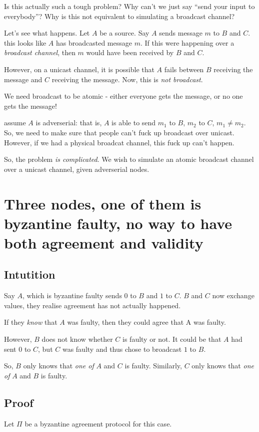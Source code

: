 \begin{itemize}
  Is this actually such a tough problem? Why can't we just say ``send your input to everybody''? Why is this not equivalent to simulating
  a broadcast channel?

  Let's see what happens. Let $A$ be a source. Say $A$ sends message $m$ to $B$
  and $C$. this looks like $A$ has broadcasted message $m$.  If this were
  happening over a \textit{broadcast channel}, then $m$ would have been
  received by $B$ and $C$.

  However, on a unicast channel, it is possible that $A$ fails between $B$ receiving the message and $C$ receiving the message.
  Now, this is \textit{not broadcast}.

  We need broadcast to be atomic - either everyone gets the message, or no one gets the message!

  assume $A$ is adverserial: that is, $A$ is able to send $m_1$ to $B$, $m_2$ to $C$, $m_1 \neq m_2$. So, we need to make sure
  that people can't fuck up broadcast over unicast. However, if we had a physical broadcat channel, this fuck up can't happen.


  So, the problem \textit{is complicated}. We wish to simulate an atomic broadcast channel over a unicast channel, given
  adverserial nodes.
\end{itemize}

\section{Three nodes, one of them is byzantine faulty, no way to have both agreement and validity}
\subsection{Intutition}
Say $A$, which is byzantine faulty sends $0$ to $B$ and $1$ to $C$. $B$ and $C$ now exchange values,
they realise agreement has not actually happened.

If they \textit{know} that $A$ was faulty, then they could agree that A was faulty.

However, $B$ does not know whether $C$ is faulty or not. It could be that $A$ had sent
$0$ to $C$, but $C$ was faulty and thus chose to broadcast $1$ to $B$.

So, $B$ only knows that \textit{one of} $A$ and $C$ is faulty.
Similarly, $C$ only knows that \textit{one of} $A$ and $B$ is faulty.

\subsection{Proof}
Let $\Pi$ be a byzantine agreement protocol for this case.

